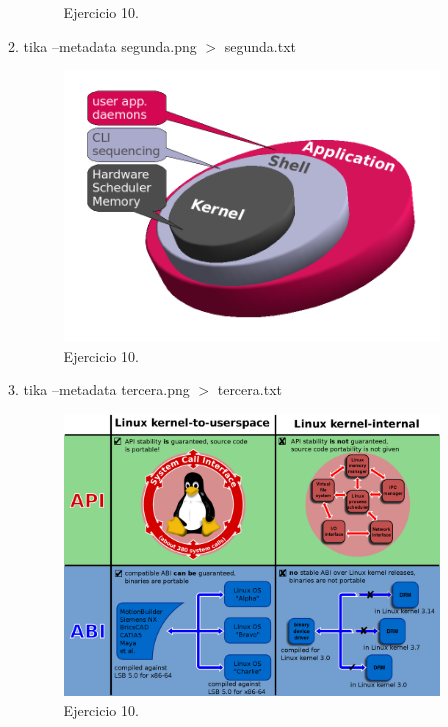 \documentclass{article}
\begin{document}
\begin{enumerate}
\begin{enumerate}
\begin{figure}[H]
                \caption{Ejercicio 10.}
                \end{figure}
                
            \item tika --metadata segunda.png $>$ segunda.txt
                \begin{figure}[H]
                \centering
                \includegraphics[width=0.7\linewidth]{./segunda}
                \caption{Ejercicio 10.}
                \end{figure}
                
            \item tika --metadata tercera.png $>$ tercera.txt
                \begin{figure}[H]
                \centering
                \includegraphics[width=0.7\linewidth]{./tercera}
                \caption{Ejercicio 10.}
                \end{figure}
                
        \end{enumerate}
\end{enumerate}
\end{document}
